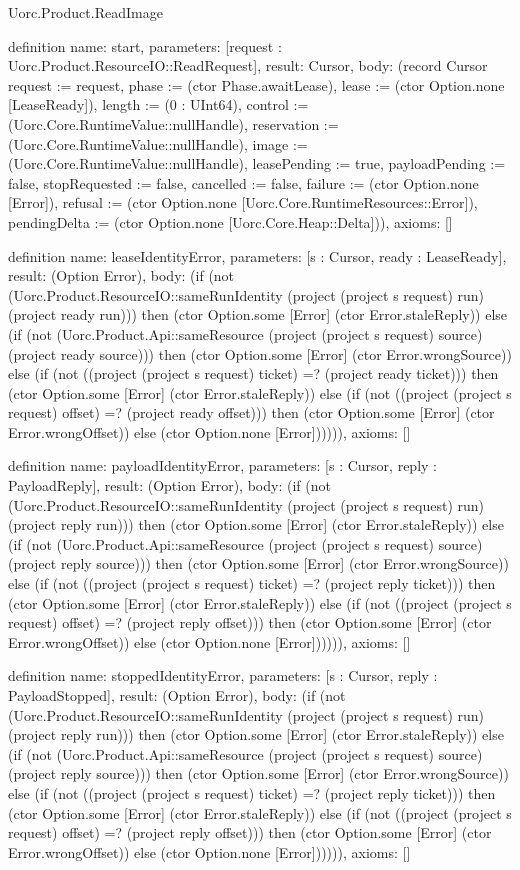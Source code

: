 \begin{lexlean}{Uorc.Product.ReadImage}
\begin{semanticmodule}
definition{
  name: start,
  parameters: [request : Uorc.Product.ResourceIO::ReadRequest],
  result: Cursor,
  body: (record Cursor {request := request, phase := (ctor Phase.awaitLease), lease := (ctor Option.none [LeaseReady]), length := (0 : UInt64), control := (Uorc.Core.RuntimeValue::nullHandle), reservation := (Uorc.Core.RuntimeValue::nullHandle), image := (Uorc.Core.RuntimeValue::nullHandle), leasePending := true, payloadPending := false, stopRequested := false, cancelled := false, failure := (ctor Option.none [Error]), refusal := (ctor Option.none [Uorc.Core.RuntimeResources::Error]), pendingDelta := (ctor Option.none [Uorc.Core.Heap::Delta])}),
  axioms: []
}

definition{
  name: leaseIdentityError,
  parameters: [s : Cursor, ready : LeaseReady],
  result: (Option Error),
  body: (if (not (Uorc.Product.ResourceIO::sameRunIdentity (project (project s request) run) (project ready run))) then (ctor Option.some [Error] (ctor Error.staleReply)) else (if (not (Uorc.Product.Api::sameResource (project (project s request) source) (project ready source))) then (ctor Option.some [Error] (ctor Error.wrongSource)) else (if (not ((project (project s request) ticket) =? (project ready ticket))) then (ctor Option.some [Error] (ctor Error.staleReply)) else (if (not ((project (project s request) offset) =? (project ready offset))) then (ctor Option.some [Error] (ctor Error.wrongOffset)) else (ctor Option.none [Error]))))),
  axioms: []
}

definition{
  name: payloadIdentityError,
  parameters: [s : Cursor, reply : PayloadReply],
  result: (Option Error),
  body: (if (not (Uorc.Product.ResourceIO::sameRunIdentity (project (project s request) run) (project reply run))) then (ctor Option.some [Error] (ctor Error.staleReply)) else (if (not (Uorc.Product.Api::sameResource (project (project s request) source) (project reply source))) then (ctor Option.some [Error] (ctor Error.wrongSource)) else (if (not ((project (project s request) ticket) =? (project reply ticket))) then (ctor Option.some [Error] (ctor Error.staleReply)) else (if (not ((project (project s request) offset) =? (project reply offset))) then (ctor Option.some [Error] (ctor Error.wrongOffset)) else (ctor Option.none [Error]))))),
  axioms: []
}

definition{
  name: stoppedIdentityError,
  parameters: [s : Cursor, reply : PayloadStopped],
  result: (Option Error),
  body: (if (not (Uorc.Product.ResourceIO::sameRunIdentity (project (project s request) run) (project reply run))) then (ctor Option.some [Error] (ctor Error.staleReply)) else (if (not (Uorc.Product.Api::sameResource (project (project s request) source) (project reply source))) then (ctor Option.some [Error] (ctor Error.wrongSource)) else (if (not ((project (project s request) ticket) =? (project reply ticket))) then (ctor Option.some [Error] (ctor Error.staleReply)) else (if (not ((project (project s request) offset) =? (project reply offset))) then (ctor Option.some [Error] (ctor Error.wrongOffset)) else (ctor Option.none [Error]))))),
  axioms: []
}


\end{semanticmodule}
\end{lexlean}
